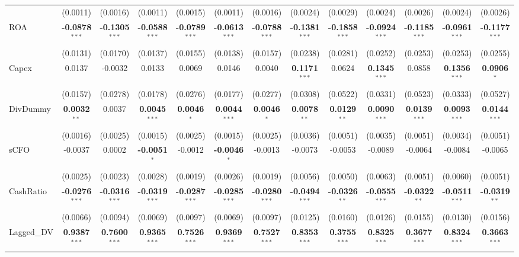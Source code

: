 \begin{landscape}
\begin{table}[H]
\begin{tabular}{lcccccccccccc}
 & (0.0011) & (0.0016) & (0.0011) & (0.0015) & (0.0011) & (0.0016) & (0.0024) & (0.0029) & (0.0024) & (0.0026) & (0.0024) & (0.0026) \\
ROA & \textbf{-0.0878}$^{***}$ & \textbf{-0.1305}$^{***}$ & \textbf{-0.0588}$^{***}$ & \textbf{-0.0789}$^{***}$ & \textbf{-0.0613}$^{***}$ & \textbf{-0.0788}$^{***}$ & \textbf{-0.1381}$^{***}$ & \textbf{-0.1858}$^{***}$ & \textbf{-0.0924}$^{***}$ & \textbf{-0.1185}$^{***}$ & \textbf{-0.0961}$^{***}$ & \textbf{-0.1177}$^{***}$ \\
 & (0.0131) & (0.0170) & (0.0137) & (0.0155) & (0.0138) & (0.0157) & (0.0238) & (0.0281) & (0.0252) & (0.0253) & (0.0253) & (0.0255) \\
Capex & 0.0137 & -0.0032 & 0.0133 & 0.0069 & 0.0146 & 0.0040 & \textbf{0.1171}$^{***}$ & 0.0624 & \textbf{0.1345}$^{***}$ & 0.0858 & \textbf{0.1356}$^{***}$ & \textbf{0.0906}$^{*}$ \\
 & (0.0157) & (0.0278) & (0.0178) & (0.0276) & (0.0177) & (0.0277) & (0.0308) & (0.0522) & (0.0331) & (0.0523) & (0.0333) & (0.0527) \\
DivDummy & \textbf{0.0032}$^{**}$ & 0.0037 & \textbf{0.0045}$^{***}$ & \textbf{0.0046}$^{*}$ & \textbf{0.0044}$^{***}$ & \textbf{0.0046}$^{*}$ & \textbf{0.0078}$^{**}$ & \textbf{0.0129}$^{**}$ & \textbf{0.0090}$^{***}$ & \textbf{0.0139}$^{***}$ & \textbf{0.0093}$^{***}$ & \textbf{0.0144}$^{***}$ \\
 & (0.0016) & (0.0025) & (0.0015) & (0.0025) & (0.0015) & (0.0025) & (0.0036) & (0.0051) & (0.0035) & (0.0051) & (0.0034) & (0.0051) \\
sCFO & -0.0037 & 0.0002 & \textbf{-0.0051}$^{*}$ & -0.0012 & \textbf{-0.0046}$^{*}$ & -0.0013 & -0.0073 & -0.0053 & -0.0089 & -0.0064 & -0.0084 & -0.0065 \\
 & (0.0025) & (0.0023) & (0.0028) & (0.0019) & (0.0026) & (0.0019) & (0.0056) & (0.0050) & (0.0063) & (0.0051) & (0.0060) & (0.0051) \\
CashRatio & \textbf{-0.0276}$^{***}$ & \textbf{-0.0316}$^{***}$ & \textbf{-0.0319}$^{***}$ & \textbf{-0.0287}$^{***}$ & \textbf{-0.0285}$^{***}$ & \textbf{-0.0280}$^{***}$ & \textbf{-0.0494}$^{***}$ & \textbf{-0.0326}$^{**}$ & \textbf{-0.0555}$^{***}$ & \textbf{-0.0322}$^{**}$ & \textbf{-0.0511}$^{***}$ & \textbf{-0.0319}$^{**}$ \\
 & (0.0066) & (0.0094) & (0.0069) & (0.0097) & (0.0069) & (0.0097) & (0.0125) & (0.0160) & (0.0126) & (0.0155) & (0.0130) & (0.0156) \\
Lagged\_DV & \textbf{0.9387}$^{***}$ & \textbf{0.7600}$^{***}$ & \textbf{0.9365}$^{***}$ & \textbf{0.7526}$^{***}$ & \textbf{0.9369}$^{***}$ & \textbf{0.7527}$^{***}$ & \textbf{0.8353}$^{***}$ & \textbf{0.3755}$^{***}$ & \textbf{0.8325}$^{***}$ & \textbf{0.3677}$^{***}$ & \textbf{0.8324}$^{***}$ & \textbf{0.3663}$^{***}$ \\

\end{tabular}
\end{table}
\end{landscape}
